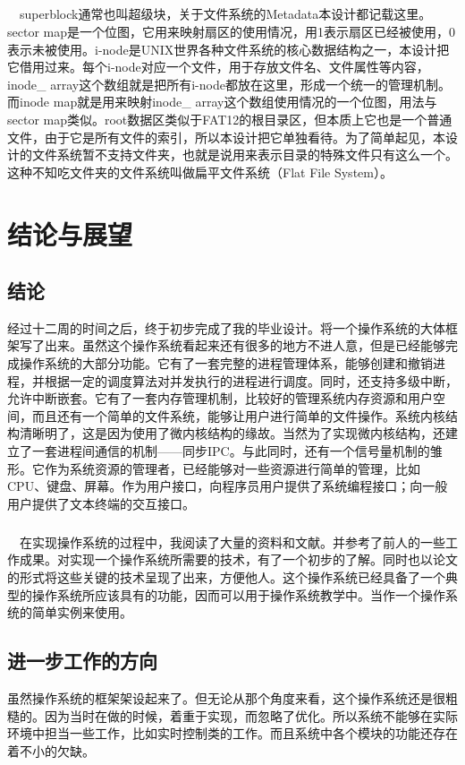 \documentclass[UTF8,nofonts,cs4size]{ctexrep}
\begin{document}
\paragraph{}
\indent \ \ 
superblock通常也叫超级块，关于文件系统的Metadata本设计都记载这里。sector map是一个位图，它用来映射扇区的使用情况，用1表示扇区已经被使用，0表示未被使用。i-node是UNIX世界各种文件系统的核心数据结构之一，本设计把它借用过来。每个i-node对应一个文件，用于存放文件名、文件属性等内容，inode\_ array这个数组就是把所有i-node都放在这里，形成一个统一的管理机制。而inode map就是用来映射inode\_ array这个数组使用情况的一个位图，用法与sector map类似。root数据区类似于FAT12的根目录区，但本质上它也是一个普通文件，由于它是所有文件的索引，所以本设计把它单独看待。为了简单起见，本设计的文件系统暂不支持文件夹，也就是说用来表示目录的特殊文件只有这么一个。这种不知吃文件夹的文件系统叫做扁平文件系统（Flat File System）。
\chapter{结论与展望}
\section{结论}
经过十二周的时间之后，终于初步完成了我的毕业设计。将一个操作系统的大体框架写了出来。虽然这个操作系统看起来还有很多的地方不进人意，但是已经能够完成操作系统的大部分功能。它有了一套完整的进程管理体系，能够创建和撤销进程，并根据一定的调度算法对并发执行的进程进行调度。同时，还支持多级中断，允许中断嵌套。它有了一套内存管理机制，比较好的管理系统内存资源和用户空间，而且还有一个简单的文件系统，能够让用户进行简单的文件操作。系统内核结构清晰明了，这是因为使用了微内核结构的缘故。当然为了实现微内核结构，还建立了一套进程间通信的机制——同步IPC。与此同时，还有一个信号量机制的雏形。它作为系统资源的管理者，已经能够对一些资源进行简单的管理，比如CPU、键盘、屏幕。作为用户接口，向程序员用户提供了系统编程接口；向一般用户提供了文本终端的交互接口。
\paragraph{}
\indent \ \ 
在实现操作系统的过程中，我阅读了大量的资料和文献。并参考了前人的一些工作成果。对实现一个操作系统所需要的技术，有了一个初步的了解。同时也以论文的形式将这些关键的技术呈现了出来，方便他人。这个操作系统已经具备了一个典型的操作系统所应该具有的功能，因而可以用于操作系统教学中。当作一个操作系统的简单实例来使用。
\section{进一步工作的方向}
虽然操作系统的框架架设起来了。但无论从那个角度来看，这个操作系统还是很粗糙的。因为当时在做的时候，着重于实现，而忽略了优化。所以系统不能够在实际环境中担当一些工作，比如实时控制类的工作。而且系统中各个模块的功能还存在着不小的欠缺。
\end{document}
